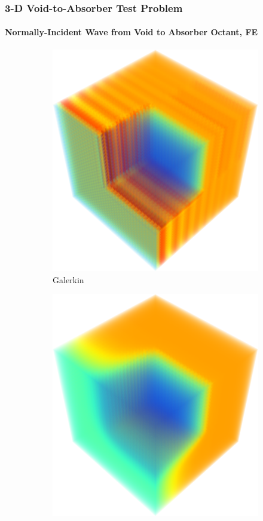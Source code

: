 \begin{frame}
\frametitle{3-D Void-to-Absorber Test Problem}
\framesubtitle{Normally-Incident Wave from Void to Absorber Octant, FE}

\begin{figure}[h]
   \centering
   \begin{subfigure}{0.45\textwidth}
      \centering
      \includegraphics[width=\textwidth]{./figures/Gal_3D.png}
      \caption{Galerkin}
   \end{subfigure}
   \begin{subfigure}{0.45\textwidth}
      \centering
      \includegraphics[width=\textwidth]{./figures/GalFCT_3D.png}

\end{subfigure}
\end{figure}
\end{frame}
